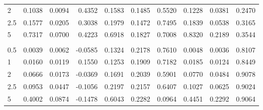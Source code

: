 \begin{table}
\begin{tabular}{lrrrrrrrrr}
2 & 0.1038 & 0.0094 & 0.4352 & 0.1583 & 0.1485 & 0.5520 & 0.1228 & 0.0381 & 0.2470 \\
2.5 & 0.1577 & 0.0205 & 0.3038 & 0.1979 & 0.1472 & 0.7495 & 0.1839 & 0.0538 & 0.3165 \\
5 & 0.7317 & 0.0700 & 0.4223 & 0.6918 & 0.1827 & 0.7008 & 0.8320 & 0.2189 & 0.3544 \\
\addlinespace
\multicolumn{10}{l}{\textit{Sin-Het}} \\
0.5 & 0.0039 & 0.0062 & -0.0585 & 0.1324 & 0.2178 & 0.7610 & 0.0048 & 0.0036 & 0.8107 \\
1 & 0.0160 & 0.0119 & 0.1550 & 0.1253 & 0.1909 & 0.7182 & 0.0185 & 0.0124 & 0.8449 \\
2 & 0.0666 & 0.0173 & -0.0369 & 0.1691 & 0.2039 & 0.5901 & 0.0770 & 0.0484 & 0.9078 \\
2.5 & 0.0953 & 0.0447 & -0.1056 & 0.2197 & 0.2157 & 0.6407 & 0.1027 & 0.0625 & 0.9024 \\
5 & 0.4002 & 0.0874 & -0.1478 & 0.6043 & 0.2282 & 0.0964 & 0.4451 & 0.2292 & 0.9064 \\
\bottomrule
\end{tabular}
\end{table}
